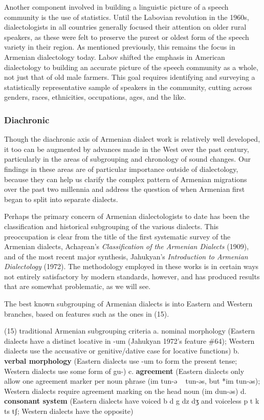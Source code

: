 Another component involved in building a linguistic picture of a speech community is the use of statistics. Until the Labovian revolution in the 1960s, dialectologists in all countries generally focused their attention on older rural speakers, as these were felt to preserve the purest or oldest form of the speech variety in their region. As mentioned previously, this remains the focus in Armenian dialectology today. Labov shifted the emphasis in American dialectology to building an accurate picture of the speech community as a whole, not just that of old male farmers. This goal requires identifying and surveying a statistically representative sample of speakers in the community, cutting across genders, races, ethnicities, occupations, ages, and the like.

\subsubsection{Diachronic}

Though the diachronic axis of Armenian dialect work is relatively well developed, it too can be augmented by advances made in the West over the past century, particularly in the areas of subgrouping and chronology of sound changes. Our findings in these areas are of particular importance outside of dialectology, because they can help us clarify the complex pattern of Armenian migrations over the past two millennia and address the question of when Armenian first began to split into separate dialects.


Perhaps the primary concern of Armenian dialectologists to date has been the classification and historical subgrouping of the various dialects. This preoccupation is clear from the title of the first systematic survey of the Armenian dialects, Achaṛean’s \textit{Classification of the Armenian Dialects} (1909), and of the most recent major synthesis, Jahukyan’s \textit{Introduction to Armenian Dialectology} (1972). The methodology employed in these works is in certain ways not entirely satisfactory by modern standards, however, and has produced results that are somewhat problematic, as we will see.


The best known subgrouping of Armenian dialects is into Eastern and Western branches, based on features such as the ones in (15).

\begin{exe}
\ex (15) traditional Armenian subgrouping criteria
a.	nominal morphology (Eastern dialects have a distinct locative in -um (Jahukyan 1972’s feature \#64); Western dialects use the accusative or genitive/dative case for locative functions)
b.	\textbf{verbal morphology} (Eastern dialects use -um to form the present tense; Western dialects use some form of gu-)
c.	\textbf{agreement} (Eastern dialects only allow one agreement marker per noun phrase (im tun-ə ~ tun-əs, but *im tun-əs); Western dialects require agreement marking on the head noun (im dun-əs)
d.	\textbf{consonant system} (Eastern dialects have voiced {b d g dz dʒ} and voiceless {p t k ts tʃ}; Western dialects have the opposite)
\end{exe}


